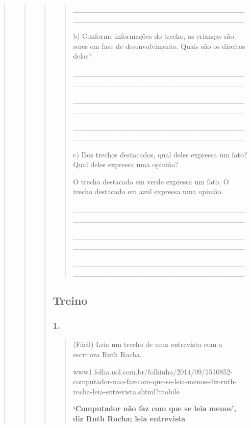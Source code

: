 \begin{quote}
\begin{quote}
\begin{quote}
\begin{quote}
\_\_\_\_\_\_\_\_\_\_\_\_\_\_\_\_\_\_\_\_\_\_\_\_\_\_\_\_\_\_\_\_\_\_\_\_\_\_\_\_\_\_\_\_\_\_\_\_\_\_\_\_\_\_\_\_\_\_\_\_\_\_\_\_

b) Conforme informações do trecho, as crianças são seres em fase de
desenvolvimento. Quais são os direitos delas?

\_\_\_\_\_\_\_\_\_\_\_\_\_\_\_\_\_\_\_\_\_\_\_\_\_\_\_\_\_\_\_\_\_\_\_\_\_\_\_\_\_\_\_\_\_\_\_\_\_\_\_\_\_\_\_\_\_\_\_\_\_\_\_\_

\_\_\_\_\_\_\_\_\_\_\_\_\_\_\_\_\_\_\_\_\_\_\_\_\_\_\_\_\_\_\_\_\_\_\_\_\_\_\_\_\_\_\_\_\_\_\_\_\_\_\_\_\_\_\_\_\_\_\_\_\_\_\_\_

\_\_\_\_\_\_\_\_\_\_\_\_\_\_\_\_\_\_\_\_\_\_\_\_\_\_\_\_\_\_\_\_\_\_\_\_\_\_\_\_\_\_\_\_\_\_\_\_\_\_\_\_\_\_\_\_\_\_\_\_\_\_\_\_

c) Dos trechos destacados, qual deles expressa um fato? Qual deles
expressa uma opinião?

O trecho destacado em verde expressa um fato. O trecho destacado em azul
expressa uma opinião.

\_\_\_\_\_\_\_\_\_\_\_\_\_\_\_\_\_\_\_\_\_\_\_\_\_\_\_\_\_\_\_\_\_\_\_\_\_\_\_\_\_\_\_\_\_\_\_\_\_\_\_\_\_\_\_\_\_\_\_\_\_\_\_\_

\_\_\_\_\_\_\_\_\_\_\_\_\_\_\_\_\_\_\_\_\_\_\_\_\_\_\_\_\_\_\_\_\_\_\_\_\_\_\_\_\_\_\_\_\_\_\_\_\_\_\_\_\_\_\_\_\_\_\_\_\_\_\_\_

\_\_\_\_\_\_\_\_\_\_\_\_\_\_\_\_\_\_\_\_\_\_\_\_\_\_\_\_\_\_\_\_\_\_\_\_\_\_\_\_\_\_\_\_\_\_\_\_\_\_\_\_\_\_\_\_\_\_\_\_\_\_\_\_
\end{quote}

\subsection{Treino}\label{treino-7}

\subsubsection{1. }\label{section-63}

\begin{quote}
(Fácil) Leia um trecho de uma entrevista com a escritora Ruth Rocha.

www1.folha.uol.com.br/folhinha/2014/09/1510852-computador-nao-faz-com-que-se-leia-menos-diz-ruth-rocha-leia-entrevista.shtml?mobile

\textbf{`Computador não faz com que se leia menos', diz Ruth Rocha; leia
entrevista}


\end{quote}
\end{quote}
\end{quote}
\end{quote}
